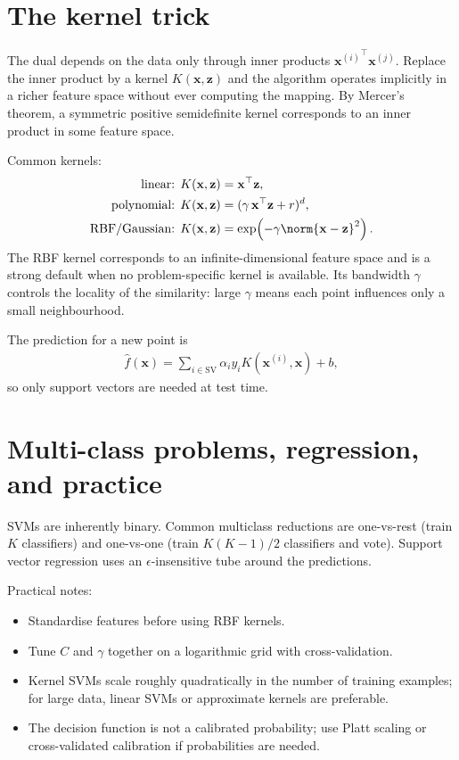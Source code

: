 \documentclass[a4paper, 12pt]{book}
\begin{document}
\section{The kernel trick}

The dual depends on the data only through inner products
${\mathbf{x}^{(i)}}^\top\mathbf{x}^{(j)}$. Replace the inner product by a kernel
$K(\mathbf{x},\mathbf{z})$ and the algorithm operates implicitly in a richer feature
space without ever computing the mapping. By Mercer's theorem, a symmetric positive
semidefinite kernel corresponds to an inner product in some feature space.

Common kernels:
\begin{align}
    \text{linear: } & K(\mathbf{x},\mathbf{z}) = \mathbf{x}^\top\mathbf{z},\\
    \text{polynomial: } & K(\mathbf{x},\mathbf{z}) = (\gamma\,\mathbf{x}^\top\mathbf{z}+r)^d,\\
    \text{RBF/Gaussian: } & K(\mathbf{x},\mathbf{z}) =
      \exp\!\left(-\gamma\norm{\mathbf{x}-\mathbf{z}}^2\right).
\end{align}
The RBF kernel corresponds to an infinite-dimensional feature space and is a strong
default when no problem-specific kernel is available. Its bandwidth $\gamma$ controls
the locality of the similarity: large $\gamma$ means each point influences only a
small neighbourhood.

The prediction for a new point is
\begin{align}
    \hat{f}(\mathbf{x})
    = \sum_{i \in \mathrm{SV}} \alpha_i y_i K(\mathbf{x}^{(i)},\mathbf{x}) + b,
\end{align}
so only support vectors are needed at test time.

\section{Multi-class problems, regression, and practice}

SVMs are inherently binary. Common multiclass reductions are one-vs-rest (train $K$
classifiers) and one-vs-one (train $K(K-1)/2$ classifiers and vote). Support vector
regression uses an $\epsilon$-insensitive tube around the predictions.

Practical notes:
\begin{itemize}
    \item Standardise features before using RBF kernels.
    \item Tune $C$ and $\gamma$ together on a logarithmic grid with cross-validation.
    \item Kernel SVMs scale roughly quadratically in the number of training examples;
    for large data, linear SVMs or approximate kernels are preferable.
    \item The decision function is not a calibrated probability; use Platt scaling or
    cross-validated calibration if probabilities are needed.
\end{itemize}
\end{document}
